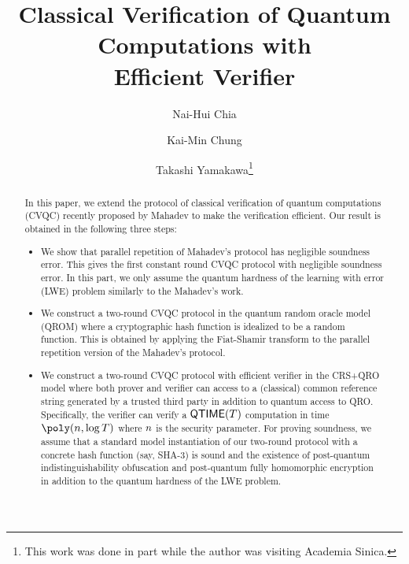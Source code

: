 \documentclass[11pt]{article}
\title{Classical Verification of Quantum Computations with \\ Efficient Verifier}
\begin{document}
\author[1]{Nai-Hui Chia}
\author[2]{Kai-Min Chung}
\author[3]{Takashi Yamakawa\thanks{This work was done in part while the author was visiting Academia Sinica.}}



\maketitle
\begin{abstract}
In this paper, we extend the protocol of classical verification of quantum computations (CVQC) recently proposed by Mahadev to make the verification efficient.
Our result is obtained in the following three steps:
\begin{itemize}
    \item We show that parallel repetition of Mahadev's protocol has negligible soundness error. This gives the first constant round CVQC protocol with negligible soundness error. In this part, we only assume the quantum hardness of the learning with error (LWE) problem similarly to the Mahadev's work.
    \item We construct a two-round CVQC protocol in the quantum random oracle model (QROM) where a cryptographic hash function is idealized to be a random function.
    This is obtained by applying the Fiat-Shamir transform to the parallel repetition version of the Mahadev's protocol.
    \item We construct a two-round CVQC protocol with efficient verifier in the CRS+QRO model where both prover and verifier can access to a (classical) common reference string generated by a trusted third party in addition to quantum access to QRO.
    Specifically, the verifier can verify a $\mathsf{QTIME}(T)$ computation in time $\poly(\secpar,\log T)$ where $n$ is the security parameter.
    For proving soundness, we assume that a standard model instantiation of our two-round protocol with a concrete hash function (say, SHA-3) is sound and the existence of post-quantum indistinguishability obfuscation and post-quantum fully homomorphic encryption in addition to the quantum hardness of the LWE problem. 
\end{itemize}
\end{abstract}


%
%







\appendix

\end{document}
